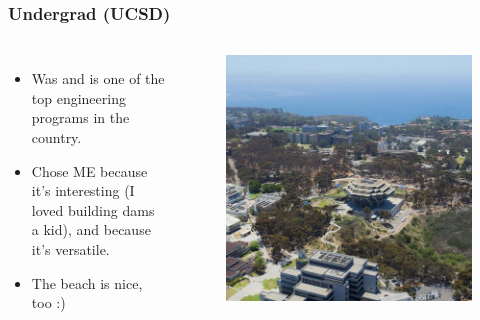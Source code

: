 \documentclass[aspectratio=169]{beamer}
\begin{document}
\begin{frame}
  \frametitle{Undergrad (UCSD)}
  \begin{columns}[t]
  \begin{itemize}
  \item Was and is one of the top engineering programs in the country.
  \item Chose ME because it's interesting (I loved building dams a
    kid), and because it's versatile.
  \item The beach is nice, too :)
  \end{itemize}

  \begin{figure}
    \includegraphics[width=0.7\linewidth]{UCSD.jpg}
  \end{figure}
  \end{columns}
\end{frame}
\end{document}
